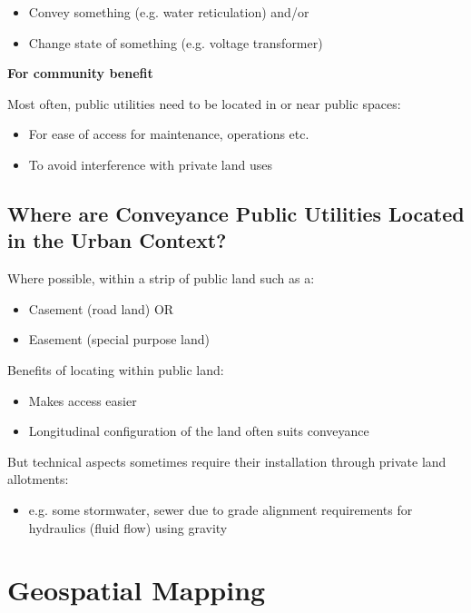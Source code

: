 \documentclass{report}
\begin{document}
	\begin{itemize}
		\item Convey something (e.g. water reticulation) and/or
		\item Change state of something (e.g. voltage transformer)
	\end{itemize}
	\textbf{For community benefit}

	Most often, public utilities need to be located in or near public spaces:

	\begin{itemize}
		\item For ease of access for maintenance, operations etc.
		\item To avoid interference with private land uses
	\end{itemize}

	\subsection{Where are Conveyance Public Utilities Located in the Urban Context?}

	Where possible, within a strip of public land such as a:
	\begin{itemize}
		\item Casement (road land) OR
		\item Easement (special purpose land)
	\end{itemize}

	Benefits of locating within public land:
	\begin{itemize}
		\item Makes access easier
		\item Longitudinal configuration of the land often suits conveyance
	\end{itemize}

	But technical aspects sometimes require their installation through private land allotments:
	\begin{itemize}
		\item e.g. some stormwater, sewer due to grade alignment requirements for hydraulics (fluid flow) using gravity
	\end{itemize}










	\section{Geospatial Mapping}
\end{document}
